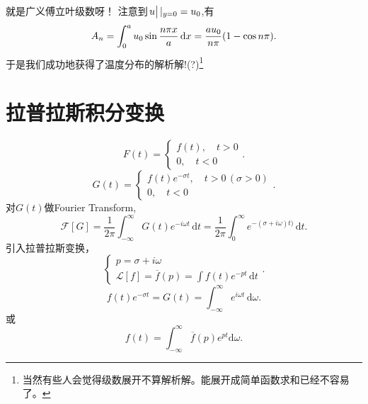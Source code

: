 \documentclass[12pt,a4paper,openany,twoside]{book}
\numberwithin{equation}{section}
\begin{document}
        就是广义傅立叶级数呀！
        注意到$\eval{u}|_{y=0} = u_0$,有
        \begin{equation}
          A_n = \int^a_0{u_0 \sin{\frac{n\pi x}{a}}\dd{x}}=\frac{a u_0}{n\pi}\qty(1-\cos{n\pi}) .
        \end{equation}
        于是我们成功地获得了温度分布的解析解!(?)\footnote{当然有些人会觉得级数展开不算解析解。能展开成简单函数求和已经不容易了。}

      \section{拉普拉斯积分变换}
        \begin{equation}
          F(t) = 
          \begin{cases}
            f(t),\quad t>0 \\
            0, \quad t<0
          \end{cases}
        .
        \end{equation} 
        \begin{equation}
          G(t) =
          \begin{cases}
          f(t)e^{-\sigma t}, \quad t>0 \,(\sigma > 0) \\
          0, \quad t<0
          \end{cases}
        .
        \end{equation} 
        对$G(t)$做Fourier Transform,
        \begin{equation}
          \mathcal{F}[G] = \frac{1}{2\pi} \int _{-\infty}^{\infty}G(t) e^{-i\omega t} \, \mathrm{d}t = \frac{1}{2\pi} \int _0^\infty e^{-(\sigma + i \omega) t)} \, \mathrm{d}t  
        .
        \end{equation} 
        引入拉普拉斯变换，
        \begin{equation}
        \begin{cases}
          p = \sigma + i \omega \\
          \mathcal{L}[f] = \overline{f}(p) = \int f(t) e^{-pt} \, \mathrm{d}t 
        \end{cases}
        .
        \end{equation} 
        \begin{equation}
          f(t)e^{-\sigma t} = G(t) = \int _{-\infty} ^ {\infty} e^{i\omega t} \, \mathrm{d}\omega 
        .
        \end{equation} 
        或
        \begin{equation}
          f(t) = \int_{-\infty}^{\infty} \overline{f}(p) e^{pt} \mathrm{d}\omega
        .
        \end{equation} 
\end{document}
